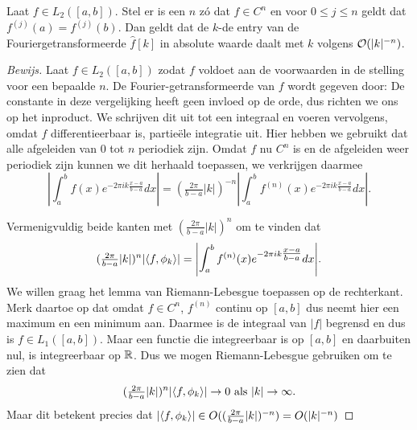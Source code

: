 \begin{stelling}
  Laat $f \in L_2([a,b])$. Stel er is een $n$ z\'o dat $f \in C^n$ en voor $0\leq j\leq n$ geldt dat $f^{(j)}(a) = f^{(j)}(b)$. Dan geldt dat de $k$-de entry van de Fouriergetransformeerde $\hat f[k]$ in absolute waarde
  daalt met $k$ volgens $\mathcal{O}(|k|^{-n})$.
\end{stelling}
\begin{proof}[Bewijs]
  Laat $f \in L_2([a,b])$ zodat $f$ voldoet aan de voorwaarden in de stelling voor een bepaalde $n$. 
  De Fourier-getransformeerde van $f$ wordt gegeven door:
  De constante in deze vergelijking heeft geen invloed op de orde, dus richten we ons op het inproduct. 
  We schrijven dit uit tot een integraal en voeren vervolgens, omdat $f$ differentieerbaar is, partie\"ele
  integratie uit.
  Hier hebben we gebruikt dat alle afgeleiden van $0$ tot $n$ periodiek zijn.
  Omdat $f$ nu $C^n$ is en de afgeleiden weer periodiek zijn kunnen we dit herhaald toepassen,
  we verkrijgen daarmee
  \[
  \left| \int_a^b f(x) e^{-2 \pi i k \tfrac{x-a}{b-a}} dx \right| 
  = (\tfrac{2 \pi}{b-a} |k|)^{-n}\left| \int_a^b f^{(n)}(x) e^{- 2 \pi i k \tfrac{x-a}{b-a}} dx \right|.
  \]
  
  Vermenigvuldig beide kanten met $(\tfrac{2 \pi}{b-a} |k|)^n$ om te vinden dat
  \[
  (\tfrac{2 \pi}{b-a} |k|)^n {\left| \langle f , \phi_k \rangle \right|} 
  = {\left| \int_a^b f^{(n)}(x) e^{- 2 \pi i k \tfrac{x-a}{b-a}} dx \right|}.
  \]
  We willen graag het lemma van Riemann-Lebesgue toepassen op de rechterkant. 
  Merk daartoe op dat omdat $f \in C^n$, $f^{(n)}$ continu op $[a,b]$ 
  dus neemt hier een maximum en een minimum aan. 
  Daarmee is de integraal van $|f|$ begrensd en dus is $f\in L_1([a,b])$. 
  Maar een functie die integreerbaar is op $[a,b]$ en daarbuiten nul, is integreerbaar op $\mathbb{R}$. 
  Dus we mogen Riemann-Lebesgue gebruiken om te zien dat
  \[
  (\tfrac{2 \pi}{b-a} |k|)^n {\left| \langle f , \phi_k \rangle \right|} \to 0 \text{ als } |k| \to \infty.
  \]
  Maar dit betekent precies dat ${\left| \langle f , \phi_k \rangle \right|} \in  O((\tfrac{2 \pi}{b-a} |k|)^{-n}) = O(|k|^{-n})$
\end{proof}


